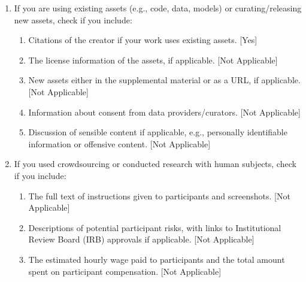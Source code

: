 \documentclass[twoside]{article}
\newcommand{\1}{{\mathbbm{1}}}
\begin{document}
\begin{enumerate}
 \item If you are using existing assets (e.g., code, data, models) or curating/releasing new assets, check if you include:
 \begin{enumerate}
   \item Citations of the creator if your work uses existing assets. [Yes]
   \item The license information of the assets, if applicable. [Not Applicable]
   \item New assets either in the supplemental material or as a URL, if applicable. [Not Applicable]
   \item Information about consent from data providers/curators. [Not Applicable]
   \item Discussion of sensible content if applicable, e.g., personally identifiable information or offensive content. [Not Applicable]
 \end{enumerate}

 \item If you used crowdsourcing or conducted research with human subjects, check if you include:
 \begin{enumerate}
   \item The full text of instructions given to participants and screenshots. [Not Applicable]
   \item Descriptions of potential participant risks, with links to Institutional Review Board (IRB) approvals if applicable. [Not Applicable]
   \item The estimated hourly wage paid to participants and the total amount spent on participant compensation. [Not Applicable]
 \end{enumerate}

 \end{enumerate}


\end{document}
